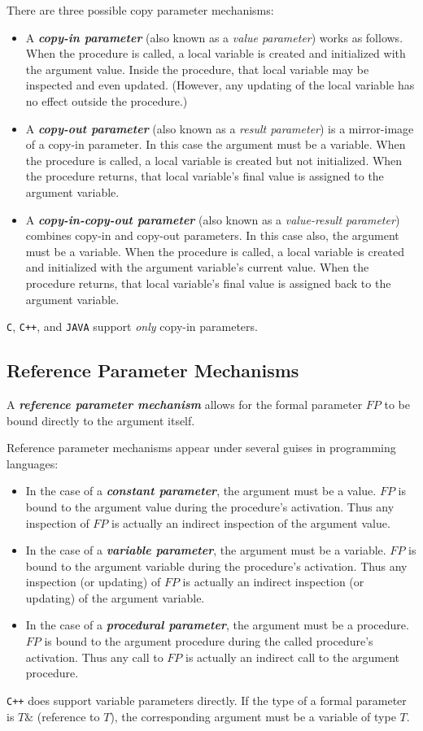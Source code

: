 \noindent There are three possible copy parameter mechanisms:
\begin{itemize}
  \item A \textit{\textbf{copy-in parameter}} (also known as a \textit{value parameter}) works as follows. When the procedure is called, a local variable is created and initialized with the argument value. Inside the procedure, that local variable may be inspected and even updated. (However, any updating of the local variable
  has no effect outside the procedure.)
  \item A \textit{\textbf{copy-out parameter}} (also known as a \textit{result parameter}) is a mirror-image of a copy-in parameter. In this case the argument must be a variable. When the procedure is called, a local variable is created but not initialized. When the procedure returns, that local variable's final value is assigned to the argument variable.
  \item A \textit{\textbf{copy-in-copy-out parameter}} (also known as a \textit{value-result parameter}) combines copy-in and copy-out parameters. In this case also, the argument must be a variable. When the procedure is called, a local variable is created and initialized with the argument variable's current value. When the procedure returns, that local variable's final value is assigned back to the argument variable.
\end{itemize}
\texttt{C}, \texttt{C++}, and \texttt{JAVA} support \textit{only} copy-in parameters.

\subsection{Reference Parameter Mechanisms}

A \textit{\textbf{reference parameter mechanism}} allows for the formal parameter $FP$ to be bound directly to the argument itself.

\noindent Reference parameter mechanisms appear under several guises in programming languages:
\begin{itemize}
  \item In the case of a \textit{\textbf{constant parameter}}, the argument must be a value. $FP$ is bound to the argument value during the procedure's activation. Thus any inspection of $FP$ is actually an indirect inspection of the argument value.
  \item In the case of a \textit{\textbf{variable parameter}}, the argument must be a variable. $FP$ is bound to the argument variable during the procedure's activation. Thus any inspection (or updating) of $FP$ is actually an indirect inspection (or updating) of the argument variable.
  \item In the case of a \textit{\textbf{procedural parameter}}, the argument must be a procedure. $FP$ is bound to the argument procedure during the called procedure's activation. Thus any call to $FP$ is actually an indirect call to the argument procedure.
\end{itemize}
\texttt{C++} does support variable parameters directly. If the type of a formal parameter is $T\&$ (reference to $T$), the corresponding argument must be a variable of type $T$.

